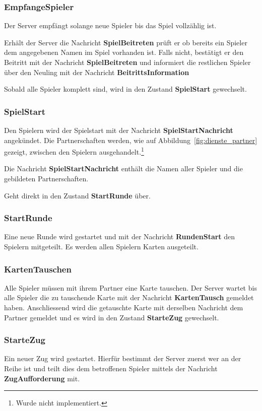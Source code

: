 \documentclass[12pt,halfparskip]{scrartcl}
\begin{document}
\subsubsection{EmpfangeSpieler}
\label{ssub:empfangespieler}
Der Server empfängt solange neue Spieler bis das Spiel vollzählig ist.

Erhält der Server die Nachricht \textbf{SpielBeitreten} prüft er ob bereits ein Spieler dem angegebenen Namen im Spiel vorhanden ist. Falls nicht, bestätigt er den Beitritt mit der Nachricht \textbf{SpielBeitreten} und informiert die restlichen Spieler über den Neuling mit der Nachricht \textbf{BeitrittsInformation}

Sobald alle Spieler komplett sind, wird in den Zustand \textbf{SpielStart} gewechselt.

\subsubsection{SpielStart}
\label{ssub:startespiel}
Den Spielern wird der Spielstart mit der Nachricht \textbf{SpielStartNachricht} angekündet. Die Partnerschaften werden, wie auf Abbildung~\vref{fig:dienste_partner} gezeigt, zwischen den Spielern ausgehandelt.\footnote{Wurde nicht implementiert.}

Die Nachricht \textbf{SpielStartNachricht} enthält die Namen aller Spieler und die gebildeten Partnerschaften.

Geht direkt in den Zustand \textbf{StartRunde} über.

\subsubsection{StartRunde}
\label{ssub:startrunde}
Eine neue Runde wird gestartet und mit der Nachricht \textbf{RundenStart} den Spielern mitgeteilt. Es werden allen Spielern Karten ausgeteilt.

\subsubsection{KartenTauschen}
\label{ssub:kartentauschen}
Alle Spieler müssen mit ihrem Partner eine Karte tauschen. Der Server wartet bis alle Spieler die zu tauschende Karte mit der Nachricht \textbf{KartenTausch} gemeldet haben. Anschliessend wird die getauschte Karte mit derselben Nachricht dem Partner gemeldet und es wird in den Zustand \textbf{StarteZug} gewechselt.

\subsubsection{StarteZug}
\label{ssub:startezug}
Ein neuer Zug wird gestartet. Hierfür bestimmt der Server zuerst wer an der Reihe ist und teilt dies dem betroffenen Spieler mittels der Nachricht \textbf{ZugAufforderung} mit. 
\end{document}
